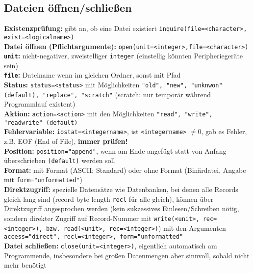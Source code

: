 \documentclass[a4paper, twocolumn]{scrarticle}
\begin{document}
\subsection{Dateien öffnen/schließen}\label{sec:dateien-oeffnen}
\textbf{Existenzprüfung:} gibt an, ob eine Datei existiert \lstinline|inquire(file=<character>, exist=<logicalname>)| \\
\textbf{Datei öffnen (Pflichtargumente):} \lstinline|open(unit=<integer>,file=<character>)|\\
\textbf{\lstinline|unit|:} nicht-negativer, zweistelliger \lstinline|integer| (einstellig könnten Peripheriegeräte sein)\\
\textbf{\lstinline|file|:} Dateiname wenn im gleichen Ordner, sonst mit Pfad\\
\textbf{Status:} \lstinline|status=<status>| mit Möglichkeiten \lstinline[style=neutral]|"old", "new", "unknwon" (default), "replace", "scratch"| (scratch: nur temporär während Programmlauf existent)\\
\textbf{Aktion:} \lstinline|action=<action>| mit den Möglichkeiten \lstinline[style=neutral]|"read", "write", "readwrite" (default)|\\
\textbf{Fehlervariable:} \lstinline|iostat=<integername>|, ist \lstinline|<integername>| $\neq 0$, gab es Fehler, z.B. EOF (End of File), \textbf{immer prüfen!}\\
\textbf{Position:} \lstinline|position="append"|, wenn am Ende angefügt statt von Anfang überschrieben \lstinline[style=neutral]|(default)| werden soll\\
\textbf{Format:} mit Format (ASCII; Standard) oder ohne Format (Binärdatei, Angabe mit \lstinline|form="unformatted"|)\\
\textbf{Direktzugriff:} spezielle Datensätze wie Datenbanken, bei denen alle Records gleich lang sind (record byte length \lstinline|recl| für alle gleich), können über Direktzugriff angesprochen werden (kein sukzessives Einlesen/Schreiben nötig, sondern direkter Zugriff auf Record-Nummer mit \lstinline|write(<unit>, rec=<integer>), bzw. read(<unit>, rec=<integer>)|) mit den Argumenten \lstinline|access="direct", recl=<integer>, form="unformatted"|\\
\textbf{Datei schließen:} \lstinline|close(unit=<integer>)|, eigentlich automatisch am Programmende, insbesondere bei großen Datenmengen aber sinnvoll, sobald nicht mehr benötigt
\end{document}
